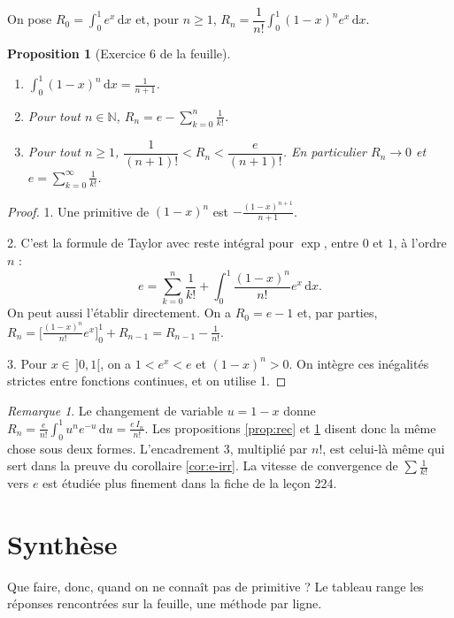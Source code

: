 \documentclass[11pt,a4paper]{article}
\theoremstyle{plain}
\newtheorem{proposition}[theoreme]{Proposition}
\theoremstyle{definition}
\theoremstyle{remark}
\newtheorem{remarque}[theoreme]{Remarque}
\newcommand{\N}{\mathbb{N}}
\newcommand{\dd}{\,\mathrm{d}}
\begin{document}
On pose $R_0=\int_0^1e^x\dd x$ et, pour $n\geq1$, $R_n=\dfrac1{n!}\displaystyle\int_0^1(1-x)^ne^x\dd x$.

\begin{proposition}[Exercice 6 de la feuille]\label{prop:taylor}
\begin{enumerate}[nosep]
\item $\int_0^1(1-x)^n\dd x=\frac1{n+1}$.
\item Pour tout $n\in\N$, $R_n=e-\displaystyle\sum_{k=0}^n\frac1{k!}$.
\item Pour tout $n\geq1$, $\dfrac1{(n+1)!}<R_n<\dfrac e{(n+1)!}$. En particulier $R_n\to0$ et $e=\displaystyle\sum_{k=0}^\infty\frac1{k!}$.
\end{enumerate}
\end{proposition}

\begin{proof}
1. Une primitive de $(1-x)^n$ est $-\frac{(1-x)^{n+1}}{n+1}$.

2. C'est la formule de Taylor avec reste intégral pour $\exp$, entre $0$ et $1$, à l'ordre $n$ :
\[
  e=\sum_{k=0}^n\frac1{k!}+\int_0^1\frac{(1-x)^n}{n!}e^x\dd x .
\]
On peut aussi l'établir directement. On a $R_0=e-1$ et, par parties, $R_n=\big[\frac{(1-x)^n}{n!}e^x\big]_0^1+R_{n-1}=R_{n-1}-\frac1{n!}$.

3. Pour $x\in\,]0,1[$, on a $1<e^x<e$ et $(1-x)^n>0$. On intègre ces inégalités strictes entre fonctions continues, et on utilise 1.
\end{proof}

\begin{remarque}
Le changement de variable $u=1-x$ donne $R_n=\frac{e}{n!}\int_0^1u^ne^{-u}\dd u=\frac{e\,I_n}{n!}$. Les propositions \ref{prop:rec} et \ref{prop:taylor} disent donc la même chose sous deux formes. L'encadrement 3, multiplié par $n!$, est celui-là même qui sert dans la preuve du corollaire \ref{cor:e-irr}. La vitesse de convergence de $\sum\frac1{k!}$ vers $e$ est étudiée plus finement dans la fiche de la leçon 224.
\end{remarque}

\section{Synthèse}

Que faire, donc, quand on ne connaît pas de primitive ? Le tableau range les réponses rencontrées sur la feuille, une méthode par ligne.
\end{document}

